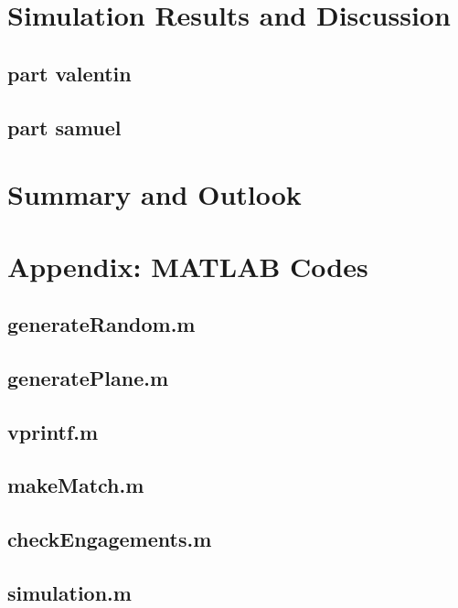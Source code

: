 \documentclass[11pt]{article}
\begin{document}
\section{Simulation Results and Discussion}

\subsection{part valentin}

\subsection{part samuel}

\section{Summary and Outlook}

\renewcommand{\refname}{\section{References}}





\section{Appendix: MATLAB Codes}

\subsection*{generateRandom.m}

\subsection*{generatePlane.m}

\subsection*{vprintf.m}

\subsection*{makeMatch.m}

\subsection*{checkEngagements.m}

\subsection*{simulation.m}

\end{document}
